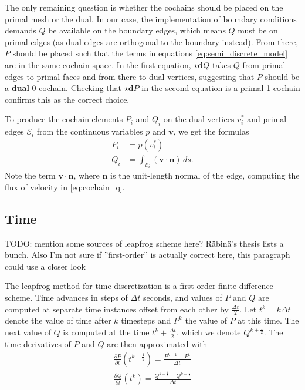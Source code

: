 \documentclass[utf8,english]{gradu3}
\begin{document}
The only remaining question is whether the cochains should be placed
on the primal mesh or the dual.
In our case, the implementation of boundary conditions demands $Q$
be available on the boundary edges, which means $Q$ must be on primal edges
(as dual edges are orthogonal to the boundary instead).
From there, $P$ should be placed such that the terms in equations \eqref{eq:semi_discrete_model}
are in the same cochain space.
In the first equation, $\star\mathbf{d}Q$
takes $Q$ from primal edges to primal faces and from there to dual vertices,
suggesting that $P$ should be a \textbf{dual} 0-cochain.
Checking that $\star \mathbf{d} P$ in the second equation
is a primal 1-cochain confirms this as the correct choice.

To produce the cochain elements $P_i$ and $Q_i$
on the dual vertices $v_i^*$ and primal edges $\mathcal{E}_i$
from the continuous variables $p$ and $\mathbf{v}$,
we get the formulas
\begin{align}
  \label{eq:cochain_p}
  P_i &= p(v_i^*) \\
  \label{eq:cochain_q}
  Q_i &= \int_{\mathcal{E}_i} (\mathbf{v} \cdot \mathbf{n}) \,ds.
\end{align}
Note the term $\mathbf{v} \cdot \mathbf{n}$,
where $\mathbf{n}$ is the unit-length normal of the edge,
computing the flux of velocity in \eqref{eq:cochain_q}.


\subsection{Time}\label{sec:time_discr}

TODO: mention some sources of leapfrog scheme here? Räbinä's thesis lists a bunch.
Also I'm not sure if ''first-order'' is actually correct here,
this paragraph could use a closer look

The leapfrog method for time discretization is a first-order finite difference scheme.
Time advances in steps of $\Delta t$ seconds,
and values of $P$ and $Q$ are computed at separate time instances
offset from each other by $\frac{\Delta t}{2}$.
Let $t^k = k\Delta t$ denote the value of time after $k$ timesteps
and $P^k$ the value of $P$ at this time.
The next value of $Q$ is computed at the time $t^k + \frac{\Delta t}{2}$,
which we denote $Q^{k+\frac{1}{2}}$.
The time derivatives of $P$ and $Q$ are then approximated with
\begin{eqnarray}
  \label{eq:time_derivative_p}
  \frac{\partial P}{\partial t}(t^{k+\frac{1}{2}}) = \frac{P^{k+1} - P^k}{\Delta t} \\
  \label{eq:time_derivative_q}
  \frac{\partial Q}{\partial t}(t^k) = \frac{Q^{k+\frac{1}{2}} - Q^{k-\frac{1}{2}}}{\Delta t}
\end{eqnarray}
\end{document}
